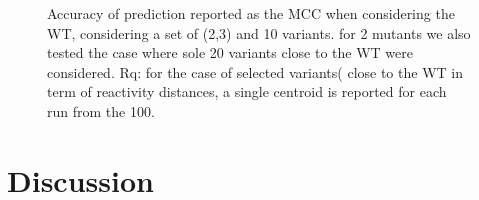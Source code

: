 \documentclass[a4,center,fleqn]{NAR}
\begin{document}
\begin{figure}
	\label{Vsrsample}
	\caption{Accuracy of prediction reported as the MCC when considering the WT, considering a set of (2,3) and 10 variants. for 2 mutants we also tested the case where sole 20 variants close to the WT were considered. Rq: for the case of selected variants( close to the WT in term of reactivity distances, a single centroid is reported for each run from the 100.}\label{fig:variantanalysis}
\end{figure}












\section{Discussion}
\end{document}
